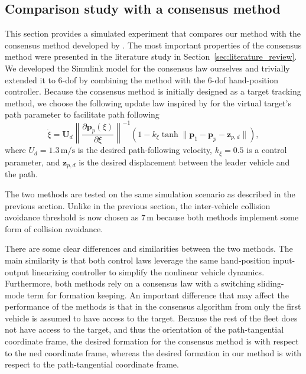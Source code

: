 \subsection{Comparison study with a consensus method}\label{sec:comparison_restrepo}
This section provides a simulated experiment that compares our method with the consensus method developed by \cite{restrepo_tracking--formation_2022}. The most important properties of the consensus method were presented in the literature study in Section~\ref{sec:literature_review}. We developed the Simulink model for the consensus law ourselves and trivially extended it to 6-\gls{dof} by combining the method with the 6-\gls{dof} hand-position controller. Because the consensus method is initially designed as a target tracking method, we choose the following update law inspired by \cite{paliotta_trajectory_2019} for the virtual target's path parameter to facilitate path following
\begin{equation}
    \dot{\xi} = \mathbf{U}_d \left\|\frac{\partial \mathbf{p}_p(\xi)}{\partial \xi}\right\|^{-1} \left(1 - k_\xi \tanh{\|\mathbf{p}_1 - \mathbf{p}_p - \mathbf{z}_{p,d}\|}\right),
\end{equation}
where $U_d = 1.3\, \mathrm{m/s}$ is the desired path-following velocity, $k_\xi= 0.5$ is a control parameter, and $\mathbf{z}_{p,d}$ is the desired displacement between the leader vehicle and the path.

The two methods are tested on the same simulation scenario as described in the previous section. Unlike in the previous section, the inter-vehicle collision avoidance threshold is now chosen as $7\, \mathrm{m}$ because both methods implement some form of collision avoidance.

There are some clear differences and similarities between the two methods. The main similarity is that both control laws leverage the same hand-position input-output linearizing controller to simplify the nonlinear vehicle dynamics. Furthermore, both methods rely on a consensus law with a switching sliding-mode term for formation keeping.  An important difference that may affect the performance of the methods is that in the consensus algorithm from \cite{restrepo_tracking--formation_2022} only the first vehicle is assumed to have access to the target. Because the rest of the fleet does not have access to the target, and thus the orientation of the path-tangential coordinate frame, the desired formation for the consensus method is with respect to the \gls{ned} coordinate frame, whereas the desired formation in our method is with respect to the path-tangential coordinate frame.

